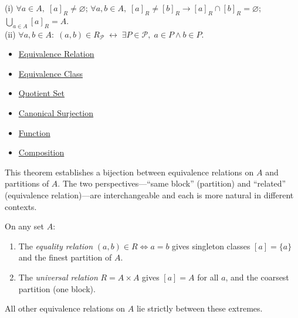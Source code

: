 \begin{remark*}
(i) $\forall a \in A,\; [a]_R \neq \varnothing$; $\forall a,b \in A,\; [a]_R \neq [b]_R \to [a]_R \cap [b]_R = \varnothing$; $\bigcup_{a \in A}[a]_R = A$.\\
(ii) $\forall a,b \in A:\; (a,b) \in R_{\mathcal{P}} \;\leftrightarrow\; \exists P \in \mathcal{P},\; a \in P \wedge b \in P$.
\end{remark*}
\begin{dependencies}
\begin{itemize}
  \item \hyperref[def:equivalence-rel]{Equivalence Relation}
  \item \hyperref[def:equiv-class]{Equivalence Class}
  \item \hyperref[def:quotient-set]{Quotient Set}
  \item \hyperref[def:canonical-surj]{Canonical Surjection}
  \item \hyperref[def:function]{Function}
  \item \hyperref[def:composition]{Composition}
\end{itemize}
\end{dependencies}

\begin{remark*}
This theorem establishes a bijection between equivalence relations on $A$
and partitions of $A$. The two perspectives---``same block'' (partition) and
``related'' (equivalence relation)---are interchangeable and each is more
natural in different contexts.
\end{remark*}

\begin{example*}
On any set $A$:
\begin{enumerate}
\item The \emph{equality relation} $(a,b) \in R \iff a=b$ gives singleton
classes $[a] = \{a\}$ and the finest partition of $A$.
\item The \emph{universal relation} $R = A \times A$ gives $[a] = A$ for all
$a$, and the coarsest partition (one block).
\end{enumerate}
All other equivalence relations on $A$ lie strictly between these extremes.
\end{example*}


